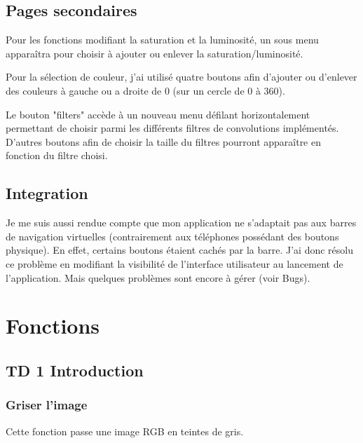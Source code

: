 \documentclass{article}
\begin{document}
\subsection{Pages secondaires}
\medbreak
Pour les fonctions modifiant la saturation et la luminosité, un sous menu apparaîtra pour choisir à ajouter ou enlever la saturation/luminosité.

Pour la sélection de couleur, j'ai utilisé quatre boutons afin d'ajouter ou d'enlever des couleurs à gauche ou a droite de 0 (sur un cercle de 0 à 360). 

Le bouton "filters" accède à un nouveau menu défilant horizontalement permettant de choisir parmi les différents filtres de convolutions implémentés. D'autres boutons afin de choisir la taille du filtres pourront apparaître en fonction du filtre choisi.
\bigbreak

\subsection{Integration}
Je me suis aussi rendue compte que mon application ne s’adaptait pas aux barres de navigation virtuelles (contrairement aux téléphones possédant des boutons physique). En effet, certains boutons étaient cachés par la barre. 
J'ai donc résolu ce problème en modifiant la visibilité de l'interface utilisateur au lancement de l'application. Mais quelques problèmes sont encore à gérer (voir Bugs).

\newpage

\section{Fonctions}

\subsection{TD 1 Introduction}
\subsubsection{Griser l'image}

Cette fonction passe une image RGB en teintes de gris.
\end{document}
